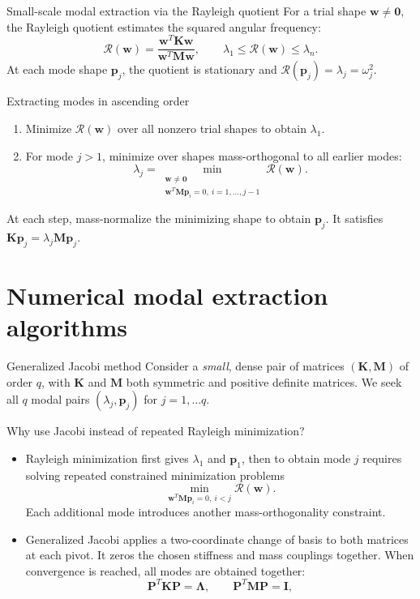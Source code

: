 \documentclass[aspectratio=169]{beamer}
\begin{document}
{  \begin{frame}{Small-scale modal extraction via the Rayleigh quotient}
    \small
    For a trial shape $\mathbf w\ne\mathbf 0$, the Rayleigh quotient estimates the squared angular frequency:
    \[
      \mathcal R(\mathbf w)=
      \frac{\mathbf w^T\mathbf K\mathbf w}{\mathbf w^T\mathbf M\mathbf w},
      \qquad \lambda_1\leq\mathcal R(\mathbf w)\leq\lambda_n .
    \]
    At each mode shape $\mathbf p_j$, the quotient is stationary and
    $\mathcal R(\mathbf p_j)=\lambda_j=\omega_j^2$.
    \begin{block}{Extracting modes in ascending order}
      \begin{enumerate}
        \item Minimize $\mathcal R(\mathbf w)$ over all nonzero trial shapes to obtain $\lambda_1$.
        \item For mode $j>1$, minimize over shapes mass-orthogonal to all earlier modes:
              \[
                \lambda_j=\min_{\substack{\mathbf w\ne\mathbf 0\\
                    \mathbf w^T\mathbf M\mathbf p_i=0,\ i=1,\ldots,j-1}}\mathcal R(\mathbf w).
              \]
      \end{enumerate}
      At each step, mass-normalize the minimizing shape to obtain $\mathbf p_j$.
      It satisfies $\mathbf K\mathbf p_j=\lambda_j\mathbf M\mathbf p_j$.
    \end{block}
  \end{frame}
 }

\section[Numerical modal extraction algorithms for small-scale problems]{Numerical modal extraction algorithms}

\begin{frame}{Generalized Jacobi method}
  \small
  Consider a \emph{small}, dense pair of matrices $(\mathbf K,\mathbf M)$ of order $q$, with $\mathbf K$ and $\mathbf M$ both symmetric and positive definite matrices.
  We seek all $q$ modal pairs $(\lambda_j,\mathbf p_j)$ for $j=1,\dots q$.
  \begin{block}{\small Why use Jacobi instead of repeated Rayleigh minimization?}
    \begin{itemize}
      \item Rayleigh minimization first gives $\lambda_1$ and $\mathbf p_1$, then to obtain mode $j$ requires solving repeated constrained minimization problems
            $$\min_{\mathbf w^T\mathbf M\mathbf p_i=0,\ i<j}\mathcal R(\mathbf w).$$
            Each additional mode introduces another mass-orthogonality constraint.
      \item Generalized Jacobi applies a two-coordinate change of basis to both matrices at each pivot. It zeros the chosen stiffness and mass couplings together. When convergence is reached, all modes are obtained together:
            \[
              \mathbf P^T\mathbf K\mathbf P=\mathbf\Lambda,
              \qquad \mathbf P^T\mathbf M\mathbf P=\mathbf I,
            \]
    \end{itemize}
  \end{block}
\end{frame}
\end{document}
